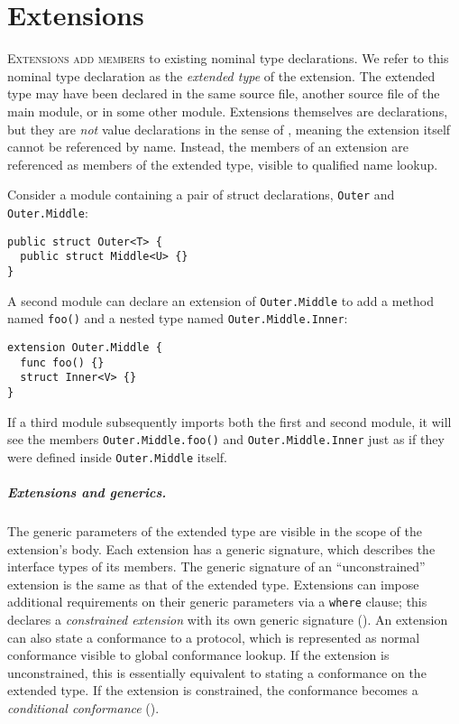 \documentclass[../generics]{subfiles}
\begin{document}
\chapter{Extensions}\label{extensions}

\lettrine{E}{xtensions add members} to existing nominal type declarations. We refer to this nominal type declaration as the \emph{extended type} of the extension. The extended type may have been declared in the same source file, another source file of the main module, or in some other module. Extensions themselves are declarations, but they are \emph{not} value declarations in the sense of , meaning the extension itself cannot be referenced by name. Instead, the members of an extension are referenced as members of the extended type, visible to qualified name lookup.

Consider a module containing a pair of struct declarations, \texttt{Outer} and \texttt{Outer.Middle}:
\begin{Verbatim}
public struct Outer<T> {
  public struct Middle<U> {}
}
\end{Verbatim}
A second module can declare an extension of \texttt{Outer.Middle} to add a method named \texttt{foo()} and a nested type named \texttt{Outer.Middle.Inner}:
\begin{Verbatim}
extension Outer.Middle {
  func foo() {}
  struct Inner<V> {}
}
\end{Verbatim}
If a third module subsequently imports both the first and second module, it will see the members \texttt{Outer.Middle.foo()} and \texttt{Outer.Middle.Inner} just as if they were defined inside \texttt{Outer.Middle} itself. 

\paragraph{Extensions and generics.}
The generic parameters of the extended type are visible in the scope of the extension's body. Each extension has a generic signature, which describes the interface types of its members. The generic signature of an ``unconstrained'' extension is the same as that of the extended type. Extensions can impose additional requirements on their generic parameters via a \texttt{where} clause; this declares a \emph{constrained extension} with its own generic signature (). An extension can also state a conformance to a protocol, which is represented as normal conformance visible to global conformance lookup. If the extension is unconstrained, this is essentially equivalent to stating a conformance on the extended type. If the extension is constrained, the conformance becomes a \emph{conditional conformance} ().
\end{document}
